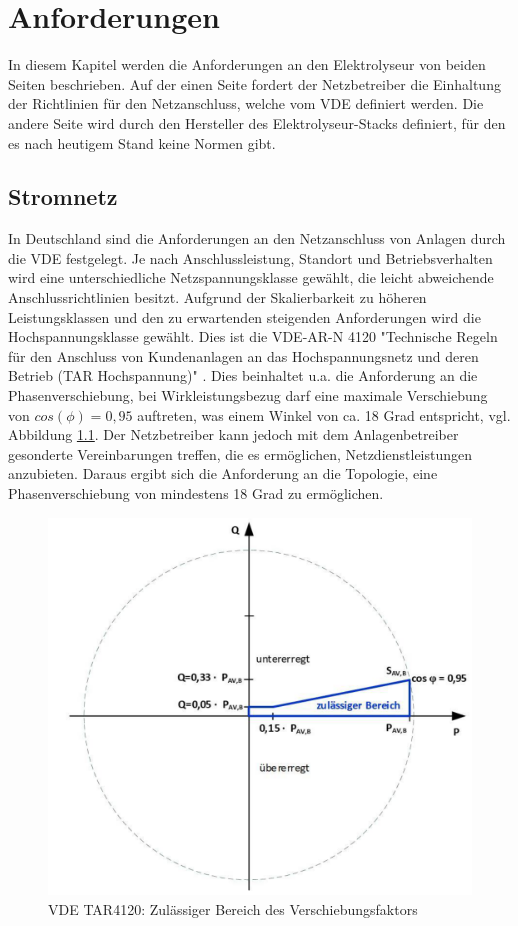\chapter{Anforderungen}
\label{chap:Anforderungen}
In diesem Kapitel werden die Anforderungen an den Elektrolyseur von beiden Seiten beschrieben. Auf der einen Seite fordert der Netzbetreiber die Einhaltung der Richtlinien für den Netzanschluss, welche vom \gls{VDE} definiert werden. Die andere Seite wird durch den Hersteller des Elektrolyseur-Stacks definiert, für den es nach heutigem Stand keine Normen gibt. 
\section {Stromnetz} \label{sec:AnfStromnetz}
In Deutschland sind die Anforderungen an den Netzanschluss von Anlagen durch die \gls{VDE} festgelegt. Je nach Anschlussleistung, Standort und Betriebsverhalten wird eine unterschiedliche Netzspannungsklasse gewählt, die leicht abweichende Anschlussrichtlinien besitzt. Aufgrund der Skalierbarkeit zu höheren Leistungsklassen und den zu erwartenden steigenden Anforderungen wird die Hochspannungsklasse gewählt. Dies ist die VDE-AR-N 4120 "Technische Regeln für den Anschluss von Kundenanlagen an das Hochspannungsnetz und deren Betrieb (TAR Hochspannung)" \cite{VDEARN4120}.
Dies beinhaltet u.a. die Anforderung an die Phasenverschiebung, bei Wirkleistungsbezug darf eine maximale Verschiebung von $cos(\phi)=0,95$ auftreten, was einem Winkel von ca. 18 Grad entspricht, vgl. Abbildung \ref{fig:tar4120pq}. Der Netzbetreiber kann jedoch mit dem Anlagenbetreiber gesonderte Vereinbarungen treffen, die es ermöglichen, Netzdienstleistungen anzubieten. Daraus ergibt sich die Anforderung an die Topologie, eine Phasenverschiebung von mindestens 18 Grad zu ermöglichen.\\
\begin{figure}[H]
	\centering
	\includegraphics[width=0.6\linewidth]{content/Grafiken/TAR4120_PQ}
	\caption[Zulässiger Bereich des Verschiebungsfaktors cos $\phi$ bei Wirkleistungsbezug]{VDE TAR4120: Zulässiger Bereich des Verschiebungsfaktors \cite{VDEARN4120}}
	\label{fig:tar4120pq}
\end{figure}
